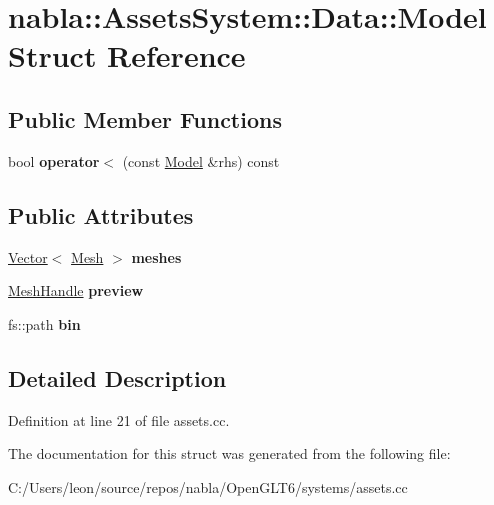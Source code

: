 \hypertarget{structnabla_1_1_assets_system_1_1_data_1_1_model}{}\section{nabla\+::Assets\+System\+::Data\+::Model Struct Reference}
\label{structnabla_1_1_assets_system_1_1_data_1_1_model}
\subsection*{Public Member Functions}
\begin{DoxyCompactItemize}
\item 
\mbox{\label{structnabla_1_1_assets_system_1_1_data_1_1_model_ac1cf63db5fee319069ffbbfd6715165e}} 
bool {\bfseries operator$<$} (const \mbox{\hyperlink{structnabla_1_1_assets_system_1_1_data_1_1_model}{Model}} \&rhs) const
\end{DoxyCompactItemize}
\subsection*{Public Attributes}
\begin{DoxyCompactItemize}
\item 
\mbox{\label{structnabla_1_1_assets_system_1_1_data_1_1_model_a4783fb8789d9eb8c0138fbb9a3453b6b}} 
\mbox{\hyperlink{classnabla_1_1_s_t_l_vector_ex}{Vector}}$<$ \mbox{\hyperlink{structnabla_1_1_assets_system_1_1_data_1_1_mesh}{Mesh}} $>$ {\bfseries meshes}
\item 
\mbox{\label{structnabla_1_1_assets_system_1_1_data_1_1_model_a68734e509fc752da2ae2b568241d5864}} 
\mbox{\hyperlink{classnabla_1_1renderer_1_1_handle}{Mesh\+Handle}} {\bfseries preview}
\item 
\mbox{\label{structnabla_1_1_assets_system_1_1_data_1_1_model_aedbe174577e3e6c3c46546f50dacb56e}} 
fs\+::path {\bfseries bin}
\end{DoxyCompactItemize}


\subsection{Detailed Description}


Definition at line 21 of file assets.\+cc.



The documentation for this struct was generated from the following file\+:\begin{DoxyCompactItemize}
\item 
C\+:/\+Users/leon/source/repos/nabla/\+Open\+G\+L\+T6/systems/assets.\+cc\end{DoxyCompactItemize}
